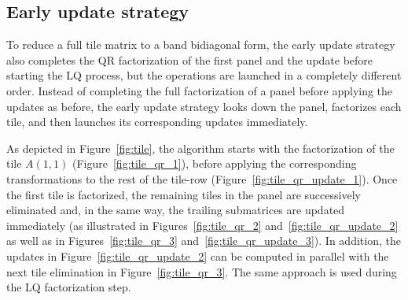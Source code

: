 \subsection{Early update strategy}
To reduce a full tile matrix to a band bidiagonal form, the early
update strategy also completes the QR factorization of the first panel
and the update before starting the LQ process, but the operations are
launched in a completely different order.  Instead of completing the
full factorization of a panel before applying the updates as before,
the early update strategy looks down the panel, factorizes each tile,
and then launches its corresponding updates immediately.

As depicted in Figure~\ref{fig:tile}, the algorithm starts with the
factorization of the tile $A(1,1)$ (Figure~\ref{fig:tile_qr_1}),
before applying the corresponding transformations to the rest of the
tile-row (Figure~\ref{fig:tile_qr_update_1}).
Once the first tile is factorized,
the remaining tiles in the panel are successively eliminated
and, in the same way, the trailing submatrices are updated immediately
(as illustrated in Figures~\ref{fig:tile_qr_2}
and~\ref{fig:tile_qr_update_2}
as well as in Figures~\ref{fig:tile_qr_3}
and~\ref{fig:tile_qr_update_3}).
In addition,
the updates in Figure~\ref{fig:tile_qr_update_2} can be computed in parallel
with the next tile elimination in Figure~\ref{fig:tile_qr_3}.
The same approach is used during the LQ factorization step.

